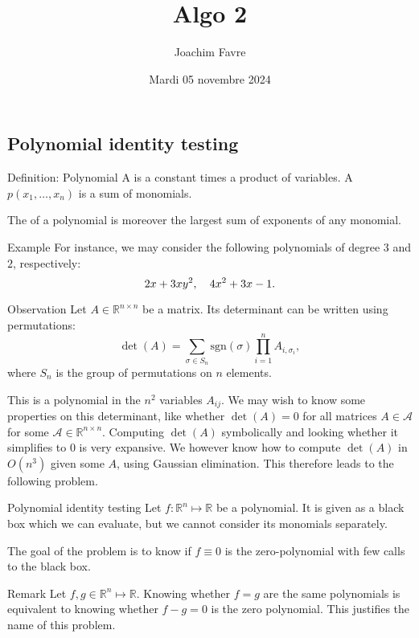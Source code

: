 \documentclass[a4paper]{article}
\title{Algo 2}
\author{Joachim Favre}
\date{Mardi 05 novembre 2024}
\begin{document}
\maketitle


\subsection{Polynomial identity testing}

\begin{parag}{Definition: Polynomial}
    A  is a constant times a product of variables. A  $p\left(x_1, \ldots, x_n\right)$ is a sum of monomials.

    The  of a polynomial is moreover the largest sum of exponents of any monomial.

    \begin{subparag}{Example}
        For instance, we may consider the following polynomials of degree $3$ and $2$, respectively: 
        \[2x + 3xy^2, \quad 4x^2 + 3x - 1.\]
    \end{subparag}
\end{parag}

\begin{parag}{Observation}
    Let $A \in \mathbb{R}^{n \times n}$ be a matrix. Its determinant can be written using permutations: 
    \[\det\left(A\right) = \sum_{\sigma \in S_n} \text{sgn}\left(\sigma\right) \prod_{i=1}^{n} A_{i, \sigma_i},\]
    where $S_n$ is the group of permutations on $n$ elements.

    This is a polynomial in the $n^2$ variables $A_{ij}$. We may wish to know some properties on this determinant, like whether $\det\left(A\right) = 0$ for all matrices $A \in \mathcal{A}$ for some $\mathcal{A} \in \mathbb{R}^{n \times n}$. Computing $\det\left(A\right)$ symbolically and looking whether it simplifies to $0$ is very expansive. We however know how to compute $\det\left(A\right)$ in $O\left(n^3\right)$ given some $A$, using Gaussian elimination. This therefore leads to the following problem.
\end{parag}

\begin{parag}{Polynomial identity testing}
    Let $f: \mathbb{R}^n \mapsto \mathbb{R}$ be a polynomial. It is given as a black box which we can evaluate, but we cannot consider its monomials separately.

    The goal of the  problem is to know if $f \equiv 0$ is the zero-polynomial with few calls to the black box.

    \begin{subparag}{Remark}
        Let $f, g \in \mathbb{R}^n \mapsto \mathbb{R}$. Knowing whether $f = g$ are the same polynomials is equivalent to knowing whether $f - g = 0$ is the zero polynomial. This justifies the name of this problem.
    \end{subparag}
\end{parag}
\end{document}
